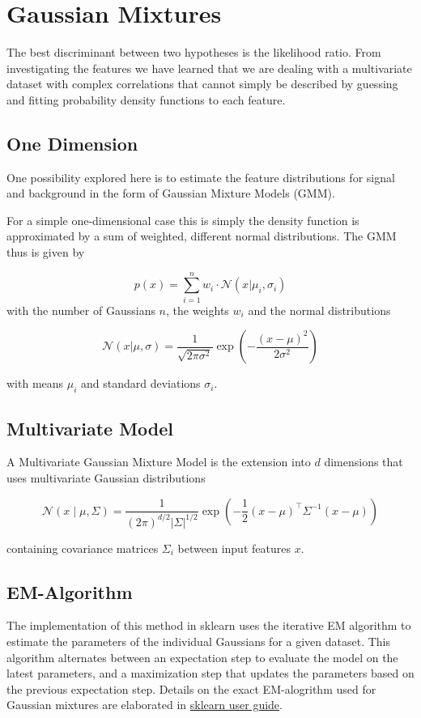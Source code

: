 
\section{Gaussian Mixtures}

The best discriminant between two hypotheses is the likelihood ratio.
From investigating the features we have learned that we are dealing with a multivariate dataset with complex correlations that cannot simply be described by guessing and fitting probability density functions to each feature. 

\subsection{One Dimension}

One possibility explored here is to estimate the feature distributions for signal and background in the form of Gaussian Mixture Models (GMM). 

For a simple one-dimensional case this is simply the density function is approximated by a sum of weighted, different normal distributions.
The GMM thus is given by

$$
p(x) = \sum_{i=1}^{n} w_{i}\cdot \mathcal{N}(x|\mu_i,\sigma_i)
$$
with the number of Gaussians $n$, the weights $w_i$ and the normal distributions 

$$
\mathcal{N}(x|\mu,\sigma) = \frac{1}{\sqrt{2\pi\sigma^{2}} }  \exp\left(-\frac{(x-\mu)^{2} }{2\sigma^{2}}\right)
$$

with means $\mu_i$ and standard deviations $\sigma_i$.


\subsection{Multivariate Model}


A Multivariate Gaussian Mixture Model is the extension into $d$ dimensions that uses multivariate Gaussian distributions 

$$
\mathcal{N}(x \mid \mu, \Sigma) = \frac{1}{(2\pi)^{d/2} |\Sigma|^{1/2}} \exp \left( -\frac{1}{2} (x - \mu)^\top \Sigma^{-1} (x - \mu) \right) 
$$

containing covariance matrices $\Sigma_i$ between input features $x$.


\subsection{EM-Algorithm}

The implementation of this method in sklearn uses the iterative EM algorithm to estimate the parameters of the individual Gaussians for a given dataset. This algorithm alternates between an expectation step to evaluate the model on the latest parameters, and a maximization step that updates the parameters based on the previous expectation step. Details on the exact EM-alogrithm used for Gaussian mixtures are elaborated in \href{https://scikit-learn.org/stable/modules/mixture.html#expectation-maximization}{sklearn user guide}.


